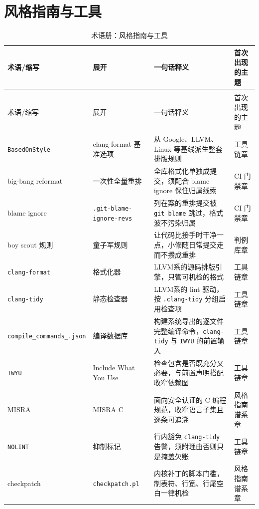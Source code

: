 \documentclass[12pt,a4paper,fontset=fandol]{ctexbook}
\newcommand{\Tp}[1]{\texttt{#1}}
\newcommand{\Bk}{\discretionary{}{}{}}
\newcommand{\Lang}[1]{\textsf{#1}}
\newcommand{\DomGo}{\Lang{Google}}
\newcommand{\DomLlvm}{\Lang{LLVM}}
\begin{document}
\section{风格指南与工具}

\begin{longtable}{@{}>{\raggedright\arraybackslash}p{}
                  >{\raggedright\arraybackslash}p{}
                  >{\raggedright\arraybackslash}p{}
                  >{\raggedright\arraybackslash}p{}@{}}
\caption{术语册：风格指南与工具}\label{tab:apA-tool}\\
\toprule
术语/缩写 & 展开 & 一句话释义 & 首次出现的主题 \\
\midrule
\endfirsthead
\multicolumn{4}{@{}l}{表~\thetable\ （续）}\\
\toprule
术语/缩写 & 展开 & 一句话释义 & 首次出现的主题 \\
\midrule
\endhead
\bottomrule
\endlastfoot
\Tp{Based{\Bk}OnStyle} & clang-format 基准选项 & 从 \DomGo、\DomLlvm、\Lang{Linux} 等基线派生整套排版规则 & 工具链章 \\
big-bang reformat & 一次性全量重排 & 全库格式化单独成提交，须配合 blame ignore 保住归属线索 & CI 门禁章 \\
blame ignore & \Tp{.git-blame-{\Bk}ignore-{\Bk}revs} & 列在案的重排提交被 \Tp{git blame} 跳过，格式波不污染归属 & CI 门禁章 \\
boy scout 规则 & 童子军规则 & 让代码比接手时干净一点，小修随日常提交走而不攒成重排 & 判例库章 \\
\Tp{clang-{\Bk}format} & 格式化器 & \DomLlvm 系的源码排版引擎，只管可机检的格式 & 工具链章 \\
\Tp{clang-{\Bk}tidy} & 静态检查器 & \DomLlvm 系的 lint 驱动，按 \Tp{.clang{\Bk}-tidy} 分组启用检查项 & 工具链章 \\
\Tp{compile{\Bk}\_commands{\Bk}\_.json} & 编译数据库 & 构建系统导出的逐文件完整编译命令，\Tp{clang-tidy} 与 \Tp{IWYU} 的前置输入 & 工具链章 \\
\Tp{IWYU} & Include What You Use & 检查包含是否既充分又必要，与前置声明搭配收窄依赖图 & 工具链章 \\
MISRA & MISRA C & 面向安全认证的 C 编程规范，收窄语言子集且逐条可追溯 & 风格指南谱系章 \\
\Tp{NOLINT} & 抑制标记 & 行内豁免 \Tp{clang-tidy} 告警，须附理由否则只是掩盖欠账 & 工具链章 \\
checkpatch & \Tp{checkpatch.pl} & 内核补丁的脚本门槛，制表符、行宽、行尾空白一律机检 & 风格指南谱系章 \\

\end{longtable}
\end{document}
